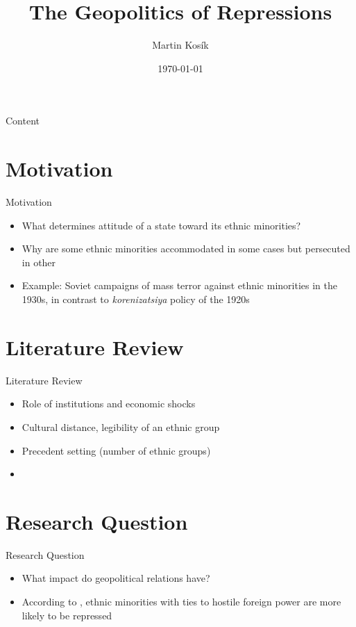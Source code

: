 \documentclass[11pt]{beamer}
\title{The Geopolitics of Repressions}
\date{\today}
\author{Martin Kosík}
\institute{Charles University}
\begin{document}
\begin{frame}
\titlepage
\end{frame}
\begin{frame}{Content}
\tableofcontents
\end{frame}


\section{Motivation}
\begin{frame}{Motivation}
\begin{itemize}
    \item What determines attitude of a state toward its ethnic minorities? 
    \item  Why are some ethnic minorities accommodated in some cases but persecuted in other
     \item Example: Soviet campaigns of mass terror against ethnic minorities in the 1930s, in contrast to \emph{korenizatsiya} policy  of the 1920s

\end{itemize}
\end{frame}
\section{Literature Review}
\begin{frame}{Literature Review}
        \begin{itemize}
        \item Role of institutions and economic shocks 
        \item Cultural distance, legibility of an ethnic group
        \item Precedent setting (number of ethnic groups)
        \item
        \end{itemize}

\end{frame}
\section{Research Question}
\begin{frame}{Research Question}
\begin{itemize}
    \item What impact do geopolitical relations have?
    \item According to \citet{mylonas_politics_2013}, ethnic minorities with ties to hostile foreign power are more likely to be repressed
    
\end{itemize}
\end{frame}
\end{document}

